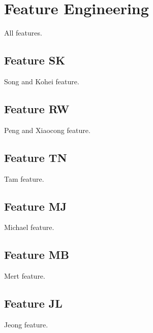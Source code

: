 \section{Feature Engineering}
All features.

\subsection{Feature SK}
Song and Kohei feature.

\subsection{Feature RW}
Peng and Xiaocong feature.

\subsection{Feature TN}
Tam feature.

\subsection{Feature MJ}
Michael feature.

\subsection{Feature MB}
Mert feature.

\subsection{Feature JL}
Jeong feature.